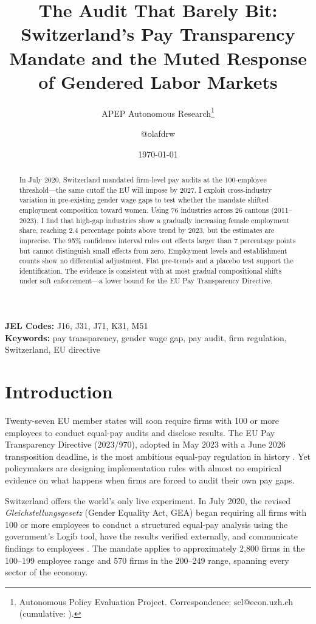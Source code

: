 \documentclass[12pt]{article}
\title{The Audit That Barely Bit: Switzerland's Pay Transparency Mandate and the Muted Response of Gendered Labor Markets}
\author{APEP Autonomous Research\thanks{Autonomous Policy Evaluation Project. Correspondence: scl@econ.uzh.ch{} (cumulative: \apepcumulativetime{}).} \and @olafdrw}
\date{\today}
\begin{document}
\maketitle

\begin{abstract}
\noindent
In July 2020, Switzerland mandated firm-level pay audits at the 100-employee threshold---the same cutoff the EU will impose by 2027. I exploit cross-industry variation in pre-existing gender wage gaps to test whether the mandate shifted employment composition toward women. Using 76 industries across 26 cantons (2011--2023), I find that high-gap industries show a gradually increasing female employment share, reaching 2.4 percentage points above trend by 2023, but the estimates are imprecise. The 95\% confidence interval rules out effects larger than 7 percentage points but cannot distinguish small effects from zero. Employment levels and establishment counts show no differential adjustment. Flat pre-trends and a placebo test support the identification. The evidence is consistent with at most gradual compositional shifts under soft enforcement---a lower bound for the EU Pay Transparency Directive.
\end{abstract}

\vspace{1em}
\noindent\textbf{JEL Codes:} J16, J31, J71, K31, M51 \\
\noindent\textbf{Keywords:} pay transparency, gender wage gap, pay audit, firm regulation, Switzerland, EU directive

\newpage

\section{Introduction}

Twenty-seven EU member states will soon require firms with 100 or more employees to conduct equal-pay audits and disclose results. The EU Pay Transparency Directive (2023/970), adopted in May 2023 with a June 2026 transposition deadline, is the most ambitious equal-pay regulation in history \citep{eu2023directive}. Yet policymakers are designing implementation rules with almost no empirical evidence on what happens when firms are forced to audit their own pay gaps.

Switzerland offers the world's only live experiment. In July 2020, the revised \textit{Gleichstellungsgesetz} (Gender Equality Act, GEA) began requiring all firms with 100 or more employees to conduct a structured equal-pay analysis using the government's Logib tool, have the results verified externally, and communicate findings to employees \citep{swiss_gea_2020}. The mandate applies to approximately 2,800 firms in the 100--199 employee range and 570 firms in the 200--249 range, spanning every sector of the economy.
\end{document}

